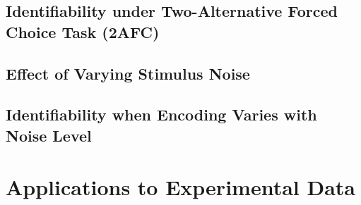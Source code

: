 \documentclass[a4paper]{article}
\begin{document}
\subsection{Identifiability under Two-Alternative Forced Choice Task (2AFC)}



\subsection{Effect of Varying Stimulus Noise}\label{sec:stimulus-noise}



\subsection{Identifiability when Encoding Varies with Noise Level}\label{sec:vary-with-noise}





\section{Applications to Experimental Data}





\clearpage
\end{document}
